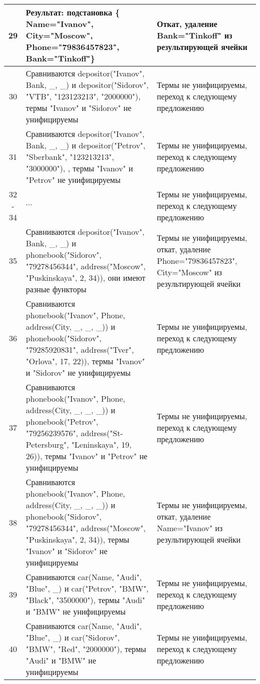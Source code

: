 \documentclass[a4paper,12pt]{article}
\begin{document}
\begin{table}[ht!] 
	\begin{tabularx}{\linewidth}{|c|>{\centering}X|>{\centering}X|}
		\hline
		29 & Результат: подстановка \{ Name="Ivanov"{}, City="Moscow"{}, Phone="79836457823"{}, Bank="Tinkoff"\} & Откат, удаление Bank="Tinkoff" из результирующей ячейки \tabularnewline
		\hline
		30 & Сравниваются depositor("Ivanov"{}, Bank, \_, \_) и depositor("Sidorov"{}, "VTB"{}, "123123213"{}, "2000000"), термы "Ivanov" и "Sidorov" не унифицируемы & Термы не унифицируемы, переход к следующему предложению \tabularnewline
		\hline
		31 & Сравниваются depositor("Ivanov"{}, Bank, \_, \_) и depositor("Petrov"{}, "Sberbank"{}, "123213213"{}, "3000000"), , термы "Ivanov" и "Petrov" не унифицируемы & Термы не унифицируемы, переход к следующему предложению \tabularnewline
		\hline
		32 - 34  & $\cdots$ & Термы не унифицируемы, переход к следующему предложению \tabularnewline
		\hline
		35 & Сравниваются depositor("Ivanov"{}, Bank, \_, \_) и phonebook("Sidorov"{}, "79278456344"{}, address("Moscow"{}, "Puskinskaya"{}, 2, 34)), они имеют разные функторы & Термы не унифицируемы, откат,  удаление Phone="79836457823"{}, City="Moscow"{} из результирующей ячейки \tabularnewline
		\hline
		36 & Сравниваются phonebook("Ivanov"{}, Phone, address(City, \_, \_, \_)) и phonebook("Sidorov"{}, "79285920831"{}, address("Tver"{}, "Orlova"{}, 17, 22)), термы "Ivanov" и "Sidorov" не унифицируемы & Термы не унифицируемы, переход к следующему предложению \tabularnewline
		\hline
		37 & Сравниваются phonebook("Ivanov"{}, Phone, address(City, \_, \_, \_)) и phonebook("Petrov"{}, "79256239576"{}, address("St-Petersburg"{}, "Leninskaya"{}, 19, 26)), термы "Ivanov" и "Petrov" не унифицируемы & Термы не унифицируемы, переход к следующему предложению \tabularnewline
		\hline
		38 & Сравниваются phonebook("Ivanov"{}, Phone, address(City, \_, \_, \_)) и phonebook("Sidorov"{}, "79278456344"{}, address("Moscow"{}, "Puskinskaya"{}, 2, 34)), термы "Ivanov" и "Sidorov" не унифицируемы & Термы не унифицируемы, откат, удаление Name="Ivanov" из результирующей ячейки \tabularnewline
		\hline
		39 & Сравниваются car(Name, "Audi"{}, "Blue"{}, \_) и car("Petrov"{}, "BMW"{}, "Black"{}, "3500000"), термы "Audi" и "BMW" не унифицируемы & Термы не унифицируемы, переход к следующему предложению \tabularnewline
		\hline
		40 & Сравниваются car(Name, "Audi"{}, "Blue"{}, \_) и car("Sidorov"{}, "BMW"{}, "Red"{}, "2000000"),  термы "Audi" и "BMW" не унифицируемы & Термы не унифицируемы, переход к следующему предложению \tabularnewline
		\hline
	\end{tabularx}
\end{table}
\end{document}
